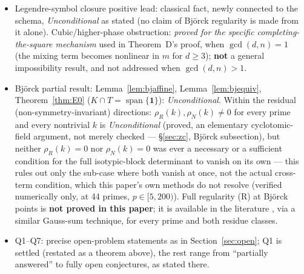 \documentclass[11pt]{article}
\theoremstyle{plain}
\theoremstyle{definition}
\theoremstyle{remark}
\begin{document}
\begin{itemize}
\textbf{both odd and even $n$}: \emph{Unconditional}, a complete proof for
all $n$ regardless of parity, with Steps 2--3 spelled out via the
reality-defect kernel $e$ (see the ``Scope of the written derivation''
remark after the proof) --- independently corroborated by hand at $n=4,9$
and numerically at all 64 tested configurations. Prior art disclosed
(remark after Corollary~\ref{cor:D2}): three older, independent
constructions --- Backelin (1989) \cite{Backelin89}, Popovi\'c (1992)
\cite{Popovic92}, Bj\"orck--Saffari (1995) \cite{BjorckSaffari95} --- each
give, by unrelated elementary methods, explicit families matching the
\emph{existence} half of this count ($\dim K$ can reach $d_{\max}$) at
non-squarefree $n$; Theorem~D's own contribution is the exact count and
the reusable mechanism, not the existence of degeneracy per se.
Corollaries~\ref{cor:D1}--\ref{cor:D2}: \emph{Unconditional} (Corollary~1
conditionally activates Theorem~C, but is itself unconditional as a
dimension/regularity statement).
\item Legendre-symbol closure positive lead: classical fact, newly
connected to the schema, \emph{Unconditional} as stated (no claim of
Bj\"orck regularity is made from it alone). Cubic/higher-phase obstruction:
\emph{proved for the specific completing-the-square mechanism} used in
Theorem~D's proof, when $\gcd(d,n)=1$ (the mixing term becomes nonlinear
in $m$ for $d\ge3$); \textbf{not} a general impossibility result, and not
addressed when $\gcd(d,n)>1$.
\item Bj\"orck partial result: Lemma~\ref{lem:bjaffine},
Lemma~\ref{lem:bjequiv}, Theorem~\ref{thm:E0} ($K\cap T=\operatorname{span}\{\mathbf1\}$):
\emph{Unconditional}. Within the residual (non-symmetry-invariant)
directions: $\rho_R(k),\rho_N(k)\ne0$ for every prime and every nontrivial
$k$ is \emph{Unconditional} (proved, an elementary cyclotomic-field
argument, not merely checked --- \S\ref{sec:zc}, Björck subsection), but
neither $\rho_R(k)=0$ nor $\rho_N(k)=0$ was ever a necessary or a
sufficient condition for the full isotypic-block determinant to vanish
on its own --- this rules out only the sub-case where both vanish at
once, not the actual cross-term condition, which this paper's own methods
do not resolve (verified numerically only, at 44 primes, $p\in[5,200)$).
Full regularity (R) at Bj\"orck points is \textbf{not proved in this
paper}; it is available in the literature \cite{Benoist24}, via a similar
Gauss-sum technique, for every prime and both residue classes.
\item Q1--Q7: precise open-problem statements as in Section~\ref{sec:open}; Q1 is
settled (restated as a theorem above), the rest range from ``partially
answered'' to fully open conjectures, as stated there.
\end{itemize}
\end{document}
